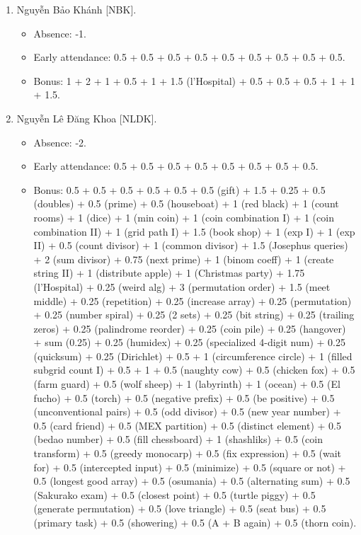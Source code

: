 \documentclass{article}
\begin{document}
\begin{enumerate}
\begin{itemize}
		\item Early attendance: 0.5 + 0.5 + 0.5 + 0.5 + 0.5 + 0.5 + 0.5 + 0.5 + 0.5 + 0.5.
		\item Bonus:
	\end{itemize}
	\item {\sc Nguyễn Bảo Khánh [NBK].}
	\begin{itemize}
        \item Absence: -1.
		\item Early attendance: 0.5 + 0.5 + 0.5 + 0.5 + 0.5 + 0.5 + 0.5 + 0.5 + 0.5.
		\item Bonus: 1 + 2 + 1 + 0.5 + 1 + 1.5 (l'Hospital) + 0.5 + 0.5 + 0.5 + 1 + 1 + 1.5.
	\end{itemize}
	\item {\sc Nguyễn Lê Đăng Khoa [NLDK].}
	\begin{itemize}
        \item Absence: -2.
		\item Early attendance: 0.5 + 0.5 + 0.5 + 0.5 + 0.5 + 0.5 + 0.5 + 0.5.
		\item Bonus: 0.5 + 0.5 + 0.5 + 0.5 + 0.5 + 0.5 (gift) + 1.5 + 0.25 + 0.5 (doubles) + 0.5 (prime) + 0.5 (houseboat) + 1 (red black) + 1 (count rooms) + 1 (dice) + 1 (min coin) + 1 (coin combination I) + 1 (coin combination II) + 1 (grid path I) + 1.5 (book shop) + 1 (exp I) + 1 (exp II) + 0.5 (count divisor) + 1 (common divisor) + 1.5 (Josephus queries) + 2 (sum divisor) + 0.75 (next prime) + 1 (binom coeff) + 1 (create string II) + 1 (distribute apple) + 1 (Christmas party) + 1.75 (l'Hospital) + 0.25 (weird alg) + 3 (permutation order) + 1.5 (meet middle) + 0.25 (repetition) + 0.25 (increase array) + 0.25 (permutation) + 0.25 (number spiral) + 0.25 (2 sets) + 0.25 (bit string) + 0.25 (trailing zeros) + 0.25 (palindrome reorder) + 0.25 (coin pile) + 0.25 (hangover) + sum (0.25) + 0.25 (humidex) + 0.25 (specialized 4-digit num) + 0.25 (quicksum) + 0.25 (Dirichlet) + 0.5 + 1 (circumference circle) + 1 (filled subgrid count I) + 0.5 + 1 + 0.5 (naughty cow) + 0.5 (chicken fox) + 0.5 (farm guard) + 0.5 (wolf sheep) + 1 (labyrinth) + 1 (ocean) + 0.5 (El fucho) + 0.5 (torch) + 0.5 (negative prefix) + 0.5 (be positive) + 0.5 (unconventional pairs) + 0.5 (odd divisor) + 0.5 (new year number) + 0.5 (card friend) + 0.5 (MEX partition) + 0.5 (distinct element) + 0.5 (bedao number) + 0.5 (fill chessboard) + 1 (shashliks) + 0.5 (coin transform) + 0.5 (greedy monocarp) + 0.5 (fix expression) + 0.5 (wait for) + 0.5 (intercepted input) + 0.5 (minimize) + 0.5 (square or not) + 0.5 (longest good array) + 0.5 (osumania) + 0.5 (alternating sum) + 0.5 (Sakurako exam) + 0.5 (closest point) + 0.5 (turtle piggy) + 0.5 (generate permutation) + 0.5 (love triangle) + 0.5 (seat bus) + 0.5 (primary task) + 0.5 (showering) + 0.5 (A + B again) + 0.5 (thorn coin).

\end{itemize}
\end{enumerate}
\end{document}
